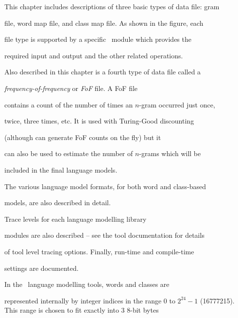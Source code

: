 This chapter includes descriptions of three basic types of data file: gram


file, word map file, and class map file.  As shown in the figure, each


file type is supported by a specific \HTK\ module which provides the


required input and output and the other related operations.





Also described in this chapter is a fourth type of data file called a


\textit{frequency-of-frequency} or \textit{FoF} file.  A FoF file


contains a count of the number of times an $n$-gram occurred just once,


twice, three times, etc.  It is used with Turing-Good discounting


(although  can generate FoF counts on the fly) but it


can also be used to estimate the number of $n$-grams which will be


included in the final language models.





The various language model formats, for both word and class-based


models, are also described in detail.





Trace levels for each language modelling library


modules are also described -- see the tool documentation for details


of tool level tracing options.  Finally, run-time and compile-time


settings are documented.













In the \HTK\ language modelling tools, words and classes are


represented internally by integer indices in the range 0 to $2^{24} -


1$ (16777215).  This range is chosen to fit exactly into 3 8-bit bytes


